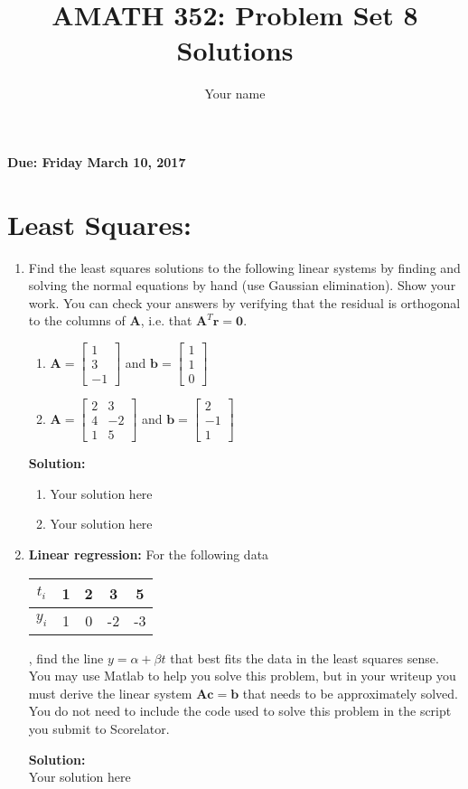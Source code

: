 \documentclass[]{article}
\title{AMATH 352: Problem Set 8 Solutions}
\author{Your name}
\newcommand{\bbm}{\begin{bmatrix}}		%
\newcommand{\ebm}{\end{bmatrix}}		%
\newcommand{\A}{\bm{A}}					%
\newcommand{\solution}{\vskip 0.5cm \textbf{\large Solution:} \\}
\begin{document}
\maketitle
{\Large \textbf{Due: Friday March 10, 2017}} \\


\section*{Least Squares:}
\begin{enumerate}
	\item Find the least squares solutions to the following linear systems by finding and solving the normal equations by hand (use Gaussian elimination). Show your work. You can check your answers by verifying that the residual is orthogonal to the columns of $\A$, i.e. that $\A^T\bm{r}=\bm{0}$.
	\begin{enumerate}
		\item $\A=\bbm 1\\3\\-1\ebm$ and $\bm{b}=\bbm 1\\1\\0\ebm$
		\item $\A=\bbm 2&3\\4&-2\\1&5\ebm$ and $ \bm{b}=\bbm 2\\-1\\1\ebm$ 
	\end{enumerate}

	\solution
	\begin{enumerate}
		\item Your solution here
		\item Your solution here
	\end{enumerate}

	\item \textbf{Linear regression:} For the following data \begin{tabular}{c|cccc}$t_i$&1&2&3&5\\ \hline$y_i$&1&0&-2&-3\end{tabular}, find the line $y=\alpha + \beta t$ that best fits the data in the least squares sense. You may use Matlab to help you solve this problem, but in your writeup you must derive the linear system $\A\bm{c}=\bm{b}$ that needs to be approximately solved. You do not need to include the code used to solve this problem in the script you submit to Scorelator.

	\solution
	Your solution here


\end{enumerate}
\end{document}
